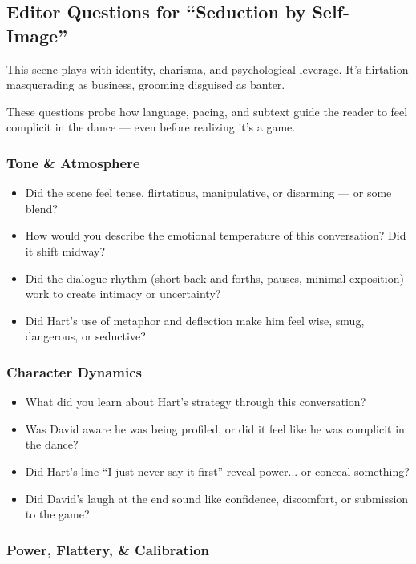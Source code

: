 \subsection*{Editor Questions for ``Seduction by Self-Image''}
This scene plays with identity, charisma, and psychological leverage.
It's flirtation masquerading as business, grooming disguised as banter.

These questions probe how language, pacing, and subtext guide the reader to feel complicit in the dance — even before realizing it’s a game.

\subsubsection*{Tone \& Atmosphere}

\begin{itemize}
    \item Did the scene feel tense, flirtatious, manipulative, or disarming — or some blend?
    \item How would you describe the emotional temperature of this conversation? Did it shift midway?
    \item Did the dialogue rhythm (short back-and-forths, pauses, minimal exposition) work to create intimacy or uncertainty?
    \item Did Hart’s use of metaphor and deflection make him feel wise, smug, dangerous, or seductive?
\end{itemize}

\subsubsection*{Character Dynamics}

\begin{itemize}
    \item What did you learn about Hart’s strategy through this conversation?
    \item Was David aware he was being profiled, or did it feel like he was complicit in the dance?
    \item Did Hart's line “I just never say it first” reveal power... or conceal something?
    \item Did David’s laugh at the end sound like confidence, discomfort, or submission to the game?
\end{itemize}

\subsubsection*{Power, Flattery, \& Calibration}

